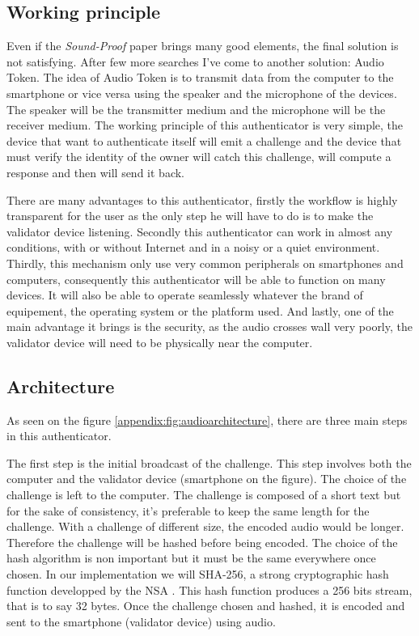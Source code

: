 \documentclass[twocolumn,14pt]{extarticle}
\begin{document}
\subsection{Working principle}
\label{sec:audiotoken:workingprinciple}
Even if the \textit{Sound-Proof} paper brings many good elements, the final solution is not satisfying. After few more searches I've come to another solution: Audio Token. The idea of Audio Token is to transmit data from the computer to the smartphone or vice versa using the speaker and the microphone of the devices. The speaker will be the transmitter medium and the microphone will be the receiver medium. The working principle of this authenticator is very simple, the device that want to authenticate itself will emit a challenge and the device that must verify the identity of the owner will catch this challenge, will compute a response and then will send it back.

There are many advantages to this authenticator, firstly the workflow is highly transparent for the user as the only step he will have to do is to make the validator device listening. Secondly this authenticator can work in almost any conditions, with or without Internet and in a noisy or a quiet environment. Thirdly, this mechanism only use very common peripherals on smartphones and computers, consequently this authenticator will be able to function on many devices. It will also be able to operate seamlessly whatever the brand of equipement, the operating system or the platform used. And lastly, one of the main advantage it brings is the security, as the audio crosses wall very poorly, the validator device will need to be physically near the computer.

\subsection{Architecture}
As seen on the figure \ref{appendix:fig:audioarchitecture}, there are three main steps in this authenticator.

The first step is the initial broadcast of the challenge. This step involves both the computer and the validator device (smartphone on the figure). The choice of the challenge is left to the computer. The challenge is composed of a short text but for the sake of consistency, it's preferable to keep the same length for the challenge. With a challenge of different size, the encoded audio would be longer. Therefore the challenge will be hashed before being encoded. The choice of the hash algorithm is non important but it must be the same everywhere once chosen. In our implementation we will SHA-256, a strong cryptographic hash function developped by the NSA \cite{wiki:SHA-2}. This hash function produces a 256 bits stream, that is to say 32 bytes. Once the challenge chosen and hashed, it is encoded and sent to the smartphone (validator device) using audio.
\end{document}
